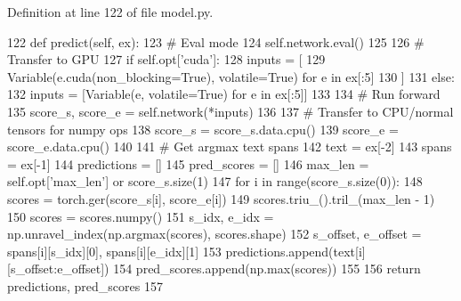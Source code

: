 Definition at line 122 of file model.\+py.


\begin{DoxyCode}
122     \textcolor{keyword}{def }predict(self, ex):
123         \textcolor{comment}{# Eval mode}
124         self.network.eval()
125 
126         \textcolor{comment}{# Transfer to GPU}
127         \textcolor{keywordflow}{if} self.opt[\textcolor{stringliteral}{'cuda'}]:
128             inputs = [
129                 Variable(e.cuda(non\_blocking=\textcolor{keyword}{True}), volatile=\textcolor{keyword}{True}) \textcolor{keywordflow}{for} e \textcolor{keywordflow}{in} ex[:5]
130             ]
131         \textcolor{keywordflow}{else}:
132             inputs = [Variable(e, volatile=\textcolor{keyword}{True}) \textcolor{keywordflow}{for} e \textcolor{keywordflow}{in} ex[:5]]
133 
134         \textcolor{comment}{# Run forward}
135         score\_s, score\_e = self.network(*inputs)
136 
137         \textcolor{comment}{# Transfer to CPU/normal tensors for numpy ops}
138         score\_s = score\_s.data.cpu()
139         score\_e = score\_e.data.cpu()
140 
141         \textcolor{comment}{# Get argmax text spans}
142         text = ex[-2]
143         spans = ex[-1]
144         predictions = []
145         pred\_scores = []
146         max\_len = self.opt[\textcolor{stringliteral}{'max\_len'}] \textcolor{keywordflow}{or} score\_s.size(1)
147         \textcolor{keywordflow}{for} i \textcolor{keywordflow}{in} range(score\_s.size(0)):
148             scores = torch.ger(score\_s[i], score\_e[i])
149             scores.triu\_().tril\_(max\_len - 1)
150             scores = scores.numpy()
151             s\_idx, e\_idx = np.unravel\_index(np.argmax(scores), scores.shape)
152             s\_offset, e\_offset = spans[i][s\_idx][0], spans[i][e\_idx][1]
153             predictions.append(text[i][s\_offset:e\_offset])
154             pred\_scores.append(np.max(scores))
155 
156         \textcolor{keywordflow}{return} predictions, pred\_scores
157 
\end{DoxyCode}
\mbox{\label{classparlai_1_1agents_1_1drqa_1_1model_1_1DocReaderModel_ac509d418866e6d8bd2ad29eaf1152f52}} 
